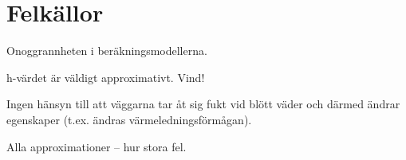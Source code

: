 \section{Felkällor}\label{sec:errors}

Onoggrannheten i beräkningsmodellerna.

h-värdet är väldigt approximativt. Vind!

Ingen hänsyn till att väggarna tar åt sig fukt vid blött väder och därmed ändrar egenskaper (t.ex. ändras värmeledningsförmågan). 

Alla approximationer – hur stora fel.



